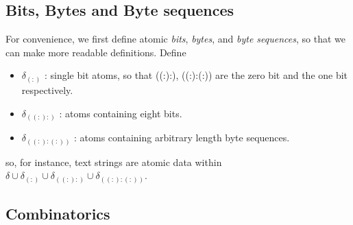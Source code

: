 \documentclass[11pt]{article}
\begin{document}
\subsection{Bits, Bytes and Byte sequences}

For convenience, we first define atomic {\it bits}, {\it bytes}, and {\it byte sequences}, so that we can make 
more readable definitions.  Define 
\begin{itemize}
\item{$\delta_{(:)}$ : single bit atoms, so that ((:):), ((:):(:)) are the zero bit and the one bit respectively.}
\item{$\delta_{((:):)}$ : atoms containing eight bits.}
\item{$\delta_{((:):(:))}$ : atoms containing arbitrary length byte sequences.}
\end{itemize}
so, for instance, text strings are atomic data within $\delta\cup\delta_{(:)}\cup\delta_{((:):)}\cup\delta_{((:):(:))}$.  

\subsection{Combinatorics} 
\end{document}
